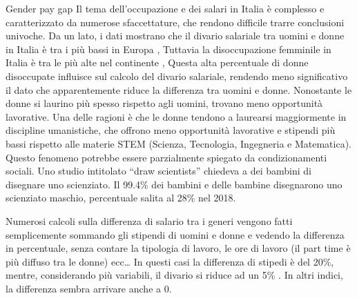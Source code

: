 \documentclass[12pt]{book} %
\begin{document}
Gender pay gap
Il tema dell’occupazione e dei salari in Italia è complesso e caratterizzato da numerose sfaccettature, che rendono difficile trarre conclusioni univoche. Da un lato, i dati mostrano che il divario salariale tra uomini e donne in Italia è tra i più bassi in Europa , Tuttavia la disoccupazione femminile in Italia è tra le più alte nel continente , Questa alta percentuale di donne disoccupate influisce sul calcolo del divario salariale, rendendo meno significativo il dato che apparentemente riduce la differenza tra uomini e donne.
Nonostante le donne si laurino più spesso rispetto agli uomini, trovano meno opportunità lavorative.
Una delle ragioni è che le donne tendono a laurearsi maggiormente in discipline umanistiche, che offrono meno opportunità lavorative e stipendi più bassi rispetto alle materie STEM (Scienza, Tecnologia, Ingegneria e Matematica).
Questo fenomeno potrebbe essere parzialmente spiegato da condizionamenti sociali. Uno studio intitolato “draw scientists” chiedeva a dei bambini di disegnare uno
scienziato. Il 99.4\% dei bambini e delle bambine disegnarono uno scienziato maschio, percentuale salita al 28\% nel 2018.

Numerosi calcoli sulla differenza di salario tra i generi vengono fatti semplicemente sommando gli stipendi di uomini e donne e
vedendo la differenza in percentuale, senza contare la tipologia di lavoro, le ore di lavoro (il part time è
più diffuso tra le donne) ecc… 
In questi casi la differenza di stipedi è del 20\%, mentre, considerando più variabili, il divario si riduce ad un 5\% . In altri indici, la differenza sembra arrivare anche a 0.
\end{document}
